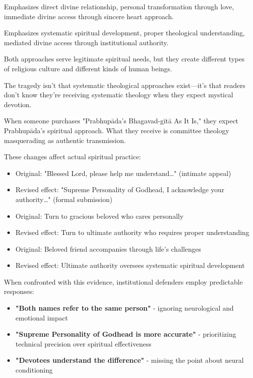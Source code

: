 \documentclass[12pt,twoside]{book}
\begin{document}
Emphasizes direct divine relationship, personal transformation through love, immediate divine access through sincere heart approach.

Emphasizes systematic spiritual development, proper theological understanding, mediated divine access through institutional authority.

Both approaches serve legitimate spiritual needs, but they create different types of religious culture and different kinds of human beings.

The tragedy isn't that systematic theological approaches exist—it's that readers don't know they're receiving systematic theology when they expect mystical devotion.

When someone purchases "Prabhupāda's Bhagavad-gītā As It Is," they expect Prabhupāda's spiritual approach. What they receive is committee theology masquerading as authentic transmission.

These changes affect actual spiritual practice:

\begin{itemize}
\item Original: "Blessed Lord, please help me understand\ldots{}" (intimate appeal)
\item Revised effect: "Supreme Personality of Godhead, I acknowledge your authority\ldots{}" (formal submission)

\item Original: Turn to gracious beloved who cares personally
\item Revised effect: Turn to ultimate authority who requires proper understanding

\item Original: Beloved friend accompanies through life's challenges
\item Revised effect: Ultimate authority oversees systematic spiritual development
\end{itemize}

When confronted with this evidence, institutional defenders employ predictable responses:

\begin{itemize}
\item \textbf{\textbf{"Both names refer to the same person"}} - ignoring neurological and emotional impact
\item \textbf{\textbf{"Supreme Personality of Godhead is more accurate"}} - prioritizing technical precision over spiritual effectiveness
\item \textbf{\textbf{"Devotees understand the difference"}} - missing the point about neural conditioning
\end{itemize}
\end{document}
